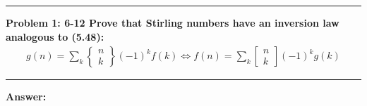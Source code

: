 \documentclass[11pt]{article}
\newcommand\question[2]{\vspace{.25in}\hrule\textbf{#1: #2}\vspace{.5em}\hrule\vspace{.10in}}
\renewcommand\part[1]{\vspace{.10in}\textbf{#1}}
\begin{document}
\raggedright
\newcommand\NAME{Shiang-Yun Yang 楊翔雲}  %
\newcommand\ANDREWID{R04922067}     %
\newcommand\HWNUM{6}              %


\question{Problem 1} {6-12 Prove that Stirling numbers have an inversion law
	analogous to (5.48):
	\begin{align*}
		g(n) = \sum_{k} \begin{Bmatrix} n \\ k \end{Bmatrix} (-1)^{k} f(k)
		\Leftrightarrow 
		f(n) = \sum_{k} \begin{bmatrix} n \\ k \end{bmatrix} (-1)^{k} g(k)
	\end{align*}
}

\part{Answer:}
\end{document}
